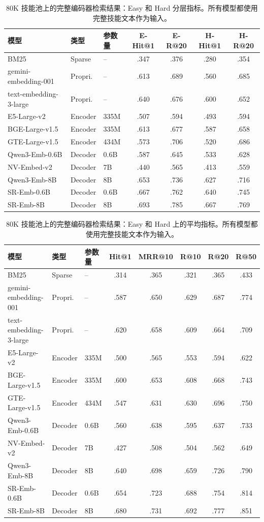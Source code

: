 \documentclass[11pt,UTF8,fontset=fandol]{ctexart}
\makeatletter
\newcommand{\Hit}{Hit@1}
\makeatother
\begin{document}
\begin{table}[H]\centering
\caption{80K 技能池上的完整编码器检索结果：Easy 和 Hard 分层指标。所有模型都使用完整技能文本作为输入。}
\begin{tabular}{lllcccc}
\toprule
模型 & 类型 & 参数量 & E-\Hit{} & E-R@20 & H-\Hit{} & H-R@20 \\ \midrule
BM25 & Sparse & -- & .347 & .376 & .280 & .354 \\
gemini-embedding-001 & Propri. & -- & .613 & .689 & .560 & .685 \\
text-embedding-3-large & Propri. & -- & .640 & .676 & .600 & .652 \\
E5-Large-v2 & Encoder & 335M & .507 & .594 & .493 & .594 \\
BGE-Large-v1.5 & Encoder & 335M & .613 & .677 & .587 & .658 \\
GTE-Large-v1.5 & Encoder & 434M & .573 & .706 & .520 & .686 \\
Qwen3-Emb-0.6B & Decoder & 0.6B & .587 & .645 & .533 & .628 \\
NV-Embed-v2 & Decoder & 7B & .440 & .565 & .413 & .559 \\
Qwen3-Emb-8B & Decoder & 8B & .653 & .736 & .627 & .716 \\
SR-Emb-0.6B & Decoder & 0.6B & .667 & .762 & .640 & .745 \\
SR-Emb-8B & Decoder & 8B & .693 & .785 & .667 & .769 \\
\bottomrule
\end{tabular}
\label{tab:19}
\end{table}

\begin{table}[H]\centering
\caption{80K 技能池上的完整编码器检索结果：Easy 和 Hard 上的平均指标。所有模型都使用完整技能文本作为输入。}
\begin{tabular}{lllccccc}
\toprule
模型 & 类型 & 参数量 & \Hit{} & MRR@10 & R@10 & R@20 & R@50 \\ \midrule
BM25 & Sparse & -- & .314 & .365 & .321 & .365 & .433 \\
gemini-embedding-001 & Propri. & -- & .587 & .650 & .629 & .687 & .774 \\
text-embedding-3-large & Propri. & -- & .620 & .658 & .609 & .664 & .709 \\
E5-Large-v2 & Encoder & 335M & .500 & .565 & .553 & .594 & .622 \\
BGE-Large-v1.5 & Encoder & 335M & .600 & .653 & .608 & .668 & .743 \\
GTE-Large-v1.5 & Encoder & 434M & .547 & .631 & .630 & .696 & .750 \\
Qwen3-Emb-0.6B & Decoder & 0.6B & .560 & .638 & .595 & .637 & .733 \\
NV-Embed-v2 & Decoder & 7B & .427 & .508 & .504 & .562 & .649 \\
Qwen3-Emb-8B & Decoder & 8B & .640 & .698 & .659 & .726 & .790 \\
SR-Emb-0.6B & Decoder & 0.6B & .654 & .723 & .688 & .754 & .814 \\
SR-Emb-8B & Decoder & 8B & .680 & .731 & .692 & .777 & .851 \\
\bottomrule
\end{tabular}
\label{tab:20}
\end{table}
\end{document}
